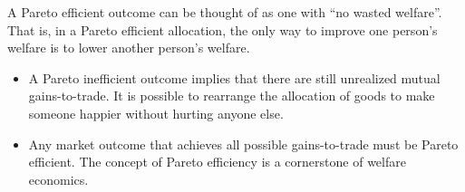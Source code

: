 A Pareto efficient outcome can be thought of as one with ``no wasted welfare''. That is, in a Pareto efficient allocation, the only way to improve one person's welfare is to lower another person's welfare.

\begin{remark}
    \begin{itemize}
    \item A Pareto inefficient outcome implies that there are still unrealized mutual gains-to-trade. It is possible to rearrange the allocation of goods to make someone happier without hurting anyone else.
    \item Any market outcome that achieves all possible gains-to-trade must be Pareto efficient. The concept of Pareto efficiency is a cornerstone of welfare economics.
\end{itemize}
\end{remark}